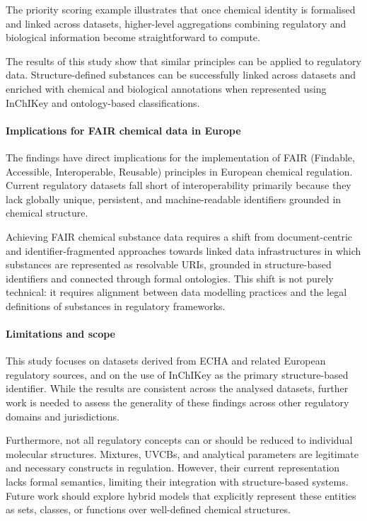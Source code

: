 The priority scoring example illustrates that once chemical identity is formalised and linked across datasets, higher-level aggregations combining regulatory and biological information become straightforward to compute.

The results of this study show that similar principles can be applied to regulatory data. Structure-defined substances can be successfully linked across datasets and enriched with chemical and biological annotations when represented using InChIKey and ontology-based classifications. 

\paragraph{Implications for FAIR chemical data in Europe}

The findings have direct implications for the implementation of FAIR (Findable, Accessible, Interoperable, Reusable) principles in European chemical regulation. Current regulatory datasets fall short of interoperability primarily because they lack globally unique, persistent, and machine-readable identifiers grounded in chemical structure.

Achieving FAIR chemical substance data requires a shift from document-centric and identifier-fragmented approaches towards linked data infrastructures in which substances are represented as resolvable URIs, grounded in structure-based identifiers and connected through formal ontologies. This shift is not purely technical: it requires alignment between data modelling practices and the legal definitions of substances in regulatory frameworks.

\paragraph{Limitations and scope}

This study focuses on datasets derived from ECHA and related European regulatory sources, and on the use of InChIKey as the primary structure-based identifier. While the results are consistent across the analysed datasets, further work is needed to assess the generality of these findings across other regulatory domains and jurisdictions.

Furthermore, not all regulatory concepts can or should be reduced to individual molecular structures. Mixtures, UVCBs, and analytical parameters are legitimate and necessary constructs in regulation. However, their current representation lacks formal semantics, limiting their integration with structure-based systems. Future work should explore hybrid models that explicitly represent these entities as sets, classes, or functions over well-defined chemical structures.

